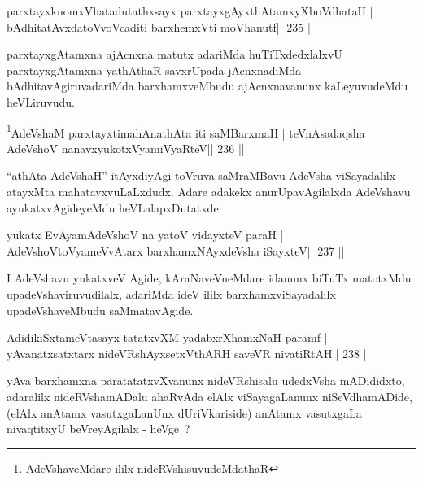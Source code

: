 \begin{shl}
parxtayxknomxVhatadutathxsayx parxtayxgAyxthAtamxyXboVdhataH |
bAdhitatAvxdatoV\s voVcaditi barxhemxVti moVhanutf\hfill || 235 ||
\end{shl}

\begin{artha}
parxtayxgAtamxna ajAcnxna matutx adariMda huTiTxdedxlalxvU parxtayxgAtamxna yathAthaR savxrUpada jAcnxnadiMda bAdhitavAgiruvadariMda barxhamxveMbudu ajAcnxnavanunx kaLeyuvudeMdu heVLiruvudu.
\end{artha}



\begin{shl}
\footnote{AdeVshaveMdare ililx nideRVshisuvudeMdathaR}AdeVshaM parxtayxtimahAnathAta iti saMBarxmaH |
teVnAsadaqsha AdeVshoV nanavxyukotxV\s yamiVyaRteV\hfill || 236 ||
\end{shl}

\begin{artha}
``athAta AdeVshaH'' itAyxdiyAgi toVruva saMraMBavu AdeVsha
  viSayadalilx atayxMta mahatavxvuLaLxdudx. Adare adakekx
  anurUpavAgilalxda AdeVshavu ayukatxvAgideyeMdu heVLalapxDutatxde.
\end{artha}


\begin{shl}
yukatx EvAyamAdeVshoV na yatoV vidayxteV paraH |
AdeVshoV\s toV\s yameVvAtarx barxhamxNAyxdeVsha iSayxteV\hfill || 237 ||
\end{shl}

\begin{artha}
I AdeVshavu yukatxveV Agide, kAraNaveVneMdare idanunx biTuTx matotxMdu upadeVshaviruvudilalx, adariMda ideV ililx barxhamxviSayadalilx upadeVshaveMbudu saMmatavAgide.
\end{artha}

\begin{shl}
AdidikiSxtameVtasayx tatatxvXM yadabxrXhamxNaH paramf |
yAvanatxsatxtarx nideVRshAyxsetxV\s thARH saveVR nivatiRtAH\hfill || 238 ||
\end{shl}

\begin{artha}
yAva barxhamxna paratatatxvXvanunx nideVRshisalu udedxVsha mADididxto,
adaralilx nideRVshamADalu ahaRvAda elAlx viSayagaLanunx
niSeVdhamADide, (elAlx anAtamx vasutxgaLanUnx dUriVkariside)
anAtamx vasutxgaLa nivaqtitxyU beVreyAgilalx - heVge~?
\end{artha}

